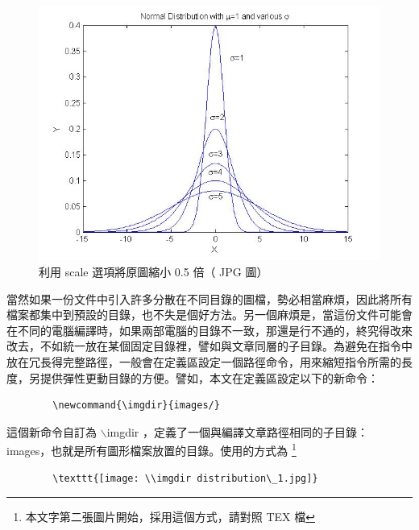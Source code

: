 \begin{figure}[h]
    \centering
        \includegraphics[scale=0.5]{distribution_1.jpg}
    \caption{利用 scale 選項將原圖縮小 0.5 倍（ JPG 圖）}
    \label{fig:scale}
\end{figure}

當然如果一份文件中引入許多分散在不同目錄的圖檔，勢必相當麻煩，因此將所有檔案都集中到預設的目錄，也不失是個好方法。另一個麻煩是，當這份文件可能會在不同的電腦編譯時，如果兩部電腦的目錄不一致，那還是行不通的，終究得改來改去，不如統一放在某個固定目錄裡，譬如與文章同層的子目錄。為避免在指令中放在冗長得完整路徑，一般會在定義區設定一個路徑命令，用來縮短指令所需的長度，另提供彈性更動目錄的方便。譬如，本文在定義區設定以下的新命令：

\bigskip
	\begin{lstlisting}
		\newcommand{\imgdir}{images/}	
	\end{lstlisting}

這個新命令自訂為  $\backslash$imgdir ，定義了一個與編譯文章路徑相同的子目錄：images，也就是所有圖形檔案放置的目錄。使用的方式為 \footnote{本文字第二張圖片開始，採用這個方式，請對照 TEX 檔}

\bigskip
	\begin{lstlisting}
		\texttt{[image: \\imgdir distribution\_1.jpg]}	
	\end{lstlisting}
	
